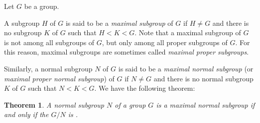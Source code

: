 \documentclass{article}
\newtheorem*{thm*}{Theorem}
\begin{document}

Let $G$ be a group.

A subgroup $H$ of $G$
is said to be a \emph{maximal subgroup} of $G$
if $H\neq G$ and there is no subgroup $K$ of $G$
such that $H<K<G$.
Note that a maximal subgroup of $G$ is not  among all subgroups of $G$,
but only among all proper subgroups of $G$.
For this reason, maximal subgroups are sometimes called \emph{maximal proper subgroups}.

Similarly, a normal subgroup $N$ of $G$
is said to be a \emph{maximal normal subgroup} 
(or \emph{maximal proper normal subgroup}) of $G$
if $N\neq G$ and there is no normal subgroup $K$ of $G$
such that $N<K<G$.
We have the following theorem:

\begin{thm*}
A normal subgroup $N$ of a group $G$ is a maximal normal subgroup
if and only if the  $G/N$
is .
\end{thm*}
\end{document}
